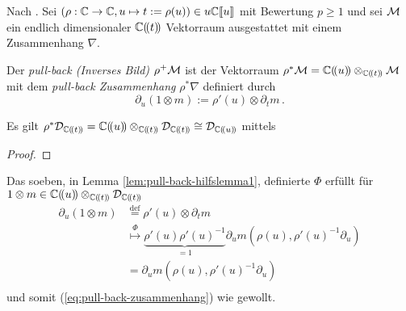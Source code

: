 Nach \cite[1.a]{sabbah_Fourier-local}. Sei $(\rho:\mathbb{C}\rightarrow \mathbb{C} , u\mapsto
t:=\rho(u))\in u{\mathbb C\llbracket u\rrbracket}$ mit Bewertung $p\geq1$ und sei $\mathcal{M}$ ein endlich
dimensionaler $\mathbb{C}(\!(t)\!)$ Vektorraum ausgestattet mit einem Zusammenhang
$\nabla$.
\begin{defn} \label{defn:pull-back}
\cite[1.a]{sabbah_Fourier-local}
Der \emph{pull-back (Inverses Bild)} $\rho^{+}\mathcal{M}$ ist der Vektorraum
$\rho^{*}\mathcal{M}=\mathbb{C}(\!(u)\!)\otimes_{\mathbb{C}(\!(t)\!)}\mathcal{M}$ mit dem \emph{pull-back
Zusammenhang} $\rho^*\nabla$ definiert durch
\begin{equation} \label{eq:pull-back-zusammenhang}
\partial_u(1\otimes m):=\rho'(u)\otimes\partial_tm \,.
\end{equation}
\end{defn}
%
\begin{lem} \label{lem:pull-back-hilfslemma1}
\def\myT{\cD_{\Cftl}}
\def\myU{\cD_{\Cful}}
Es gilt $\rho^*\myT=\Cful\otimes_{\Cftl}\myT \cong \myU$ mittels
\begin{center}
\end{center}
\end{lem}
\begin{proof}
\end{proof}
\begin{bem}
Das soeben, in Lemma \ref{lem:pull-back-hilfslemma1}, definierte $\Phi$ erfüllt
für $1\otimes m\in {\mathbb C (\!(u)\!)}\otimes_{{\mathbb C (\!(t)\!)}}\mathcal{D}_{{\mathbb C (\!(t)\!)}}$
\begin{align*}
\partial_u(1\otimes m) &\overset{\mbox{def}}{=} \rho'(u)\otimes\partial_t m \\
&\overset{\Phi}{\mapsto} \underset{=1}{\underbrace{\rho'(u)\rho'(u)^{-1}}}
  \partial_u m(\rho(u),\rho'(u)^{-1}\partial_u) \\
&= \partial_u m(\rho(u),\rho'(u)^{-1}\partial_u)\\
\end{align*}
und somit (\ref{eq:pull-back-zusammenhang}) wie gewollt.
\end{bem}
